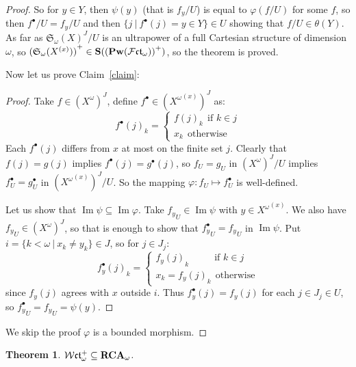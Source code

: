 \documentclass{article}
\theoremstyle{defin}
\theoremstyle{theorem}
\newtheorem{theorem}{Theorem}
\theoremstyle{claim}
\theoremstyle{prop}
\theoremstyle{lemma}
\theoremstyle{fact}
\theoremstyle{remark}
\theoremstyle{ex}
\theoremstyle{col}
\theoremstyle{question}
\begin{document}
\begin{proof}
So for $y \in Y$, then $\psi(y)$ (that is $f_y/U$) is equal to $\varphi(f/U)$ for some $f$, 
so then $f^{\bullet}/U = f_y/U$ and then $\{ j \: | \: f^{\bullet}(j) = y \in Y \} \in U$ 
showing that $f/U \in \theta(Y)$. 
As far as $\mathfrak{S}_{\omega}{(X)}^J/U$ is an ultrapower of a full Cartesian structure of dimension 
$\omega$, so ${(\mathfrak{S}_{\omega}(X^{(x)}))}^+ \in {\bf S} ({({\bf Pw}(\mathcal{F}\mathfrak{ct}_{\omega}))}^+)$, so the theorem is proved.

Now let us prove Claim~\ref{claim}:
\begin{proof}
Take $f \in {(X^{\omega})}^J$, define $f^{\bullet} \in {({X^{\omega}}^{(x)})}^J$ as:
\begin{equation}
    {f^{\bullet}(j)}_k = \begin{cases}
        {f(j)}_k \:\: \text{if $k \in j$} \\
        x_k \:\: \text{otherwise}
    \end{cases}
\end{equation}
Each $f^{\bullet}(j)$ differs from $x$ at most on the finite set $j$. Clearly that $f(j) = g(j)$ implies $f^{\bullet}(j) = g^{\bullet}(j)$, 
so $f_U = g_U$ in ${(X^{\omega})}^J/U$ implies $f^{\bullet}_U = g^{\bullet}_U$ in 
${({X^{\omega}}^{(x)})}^J/U$. So the mapping $\varphi : f_U \mapsto f^{\bullet}_U$ is well-defined.

Let us show that $\operatorname{Im}\psi \subseteq \operatorname{Im}\varphi$. 
Take ${f_y}_U \in \operatorname{Im}\psi$ with $y \in {X^{\omega}}^{(x)}$. 
We also have ${f_y}_U \in {(X^{\omega})}^J$, so that is enough to show that 
${f^{\bullet}_y}_U = {f_y}_U$ in $\operatorname{Im}\psi$. Put $i = \{ k < \omega \: | \: x_k \neq y_k \} \in J$, 
so for $j \in J_j$:
\begin{equation}
    {f^{\bullet}_y(j)}_k = \begin{cases}
        {f_y(j)}_k \:\:\:\:\:\:\:\:\:\:\:\: \text{if $k \in j$} \\
        x_k = {f_y(j)}_k \:\: \text{otherwise}
    \end{cases}
\end{equation}
since $f_y(j)$ agrees with $x$ outside $i$. Thus $f^{\bullet}_y(j) = f_y(j)$ for each $j \in J_j \in U$,
so ${f^{\bullet}_y}_U = {f_y}_U = \psi(y)$.
\end{proof}

We skip the proof $\varphi$ is a bounded morphism. 
\end{proof}

\begin{theorem}
$\mathcal{W}\mathfrak{ct}_{\omega}^+ \subseteq {\bf RCA}_{\omega}$.
\end{theorem}
\end{document}
